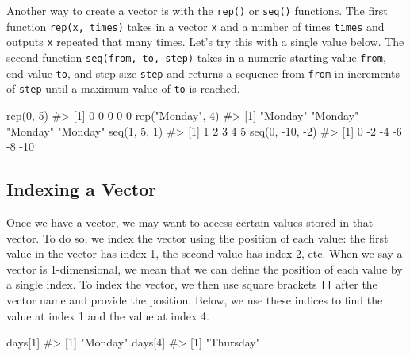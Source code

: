 \documentclass[
  letterpaper,
]{krantz}
\makeatletter
\newenvironment{Shaded}{\begin{snugshade}}{\end{snugshade}}
\newcommand{\CommentTok}[1]{\textcolor[rgb]{0.37,0.37,0.37}{#1}}
\newcommand{\DecValTok}[1]{\textcolor[rgb]{0.68,0.00,0.00}{#1}}
\newcommand{\FunctionTok}[1]{\textcolor[rgb]{0.28,0.35,0.67}{#1}}
\newcommand{\NormalTok}[1]{\textcolor[rgb]{0.00,0.23,0.31}{#1}}
\newcommand{\SpecialCharTok}[1]{\textcolor[rgb]{0.37,0.37,0.37}{#1}}
\newcommand{\StringTok}[1]{\textcolor[rgb]{0.13,0.47,0.30}{#1}}
\newenvironment{kframe}{%
\medskip{}
\setlength{\fboxsep}{.8em}
 \def\at@end@of@kframe{}%
 \ifinner\ifhmode%
  \def\at@end@of@kframe{\end{minipage}}%
  \begin{minipage}{\columnwidth}%
 \fi\fi%
 \def\FrameCommand##1{\hskip\@totalleftmargin \hskip-\fboxsep
 \colorbox{shadecolor}{##1}\hskip-\fboxsep
     \hskip-\linewidth \hskip-\@totalleftmargin \hskip\columnwidth}%
 \MakeFramed {\advance\hsize-\width
   \@totalleftmargin\z@ \linewidth\hsize
   \@setminipage}}%
 {\par\unskip\endMakeFramed%
 \at@end@of@kframe}
\renewenvironment{Shaded}{\begin{kframe}}{\end{kframe}}
\makeatother
\begin{document}
Another way to create a vector is with the \texttt{rep()} or
\texttt{seq()} functions. The first function \texttt{rep(x,\ times)}
takes in a vector \texttt{x} and a number of times \texttt{times} and
outputs \texttt{x} repeated that many times. Let's try this with a
single value below. The second function \texttt{seq(from,\ to,\ step)}
takes in a numeric starting value \texttt{from}, end value \texttt{to},
and step size \texttt{step} and returns a sequence from \texttt{from} in
increments of \texttt{step} until a maximum value of \texttt{to} is
reached.

\begin{Shaded}
\begin{Highlighting}[]
\FunctionTok{rep}\NormalTok{(}\DecValTok{0}\NormalTok{, }\DecValTok{5}\NormalTok{)}
\CommentTok{\#\textgreater{} [1] 0 0 0 0 0}
\FunctionTok{rep}\NormalTok{(}\StringTok{"Monday"}\NormalTok{, }\DecValTok{4}\NormalTok{)}
\CommentTok{\#\textgreater{} [1] "Monday" "Monday" "Monday" "Monday"}
\FunctionTok{seq}\NormalTok{(}\DecValTok{1}\NormalTok{, }\DecValTok{5}\NormalTok{, }\DecValTok{1}\NormalTok{)}
\CommentTok{\#\textgreater{} [1] 1 2 3 4 5}
\FunctionTok{seq}\NormalTok{(}\DecValTok{0}\NormalTok{, }\SpecialCharTok{{-}}\DecValTok{10}\NormalTok{, }\SpecialCharTok{{-}}\DecValTok{2}\NormalTok{)}
\CommentTok{\#\textgreater{} [1]   0  {-}2  {-}4  {-}6  {-}8 {-}10}
\end{Highlighting}
\end{Shaded}

\hypertarget{indexing-a-vector}{%
\subsection{Indexing a Vector}\label{indexing-a-vector}}

Once we have a vector, we may want to access certain values stored in
that vector. To do so, we index the vector using the position of each
value: the first value in the vector has index 1, the second value has
index 2, etc. When we say a vector is 1-dimensional, we mean that we can
define the position of each value by a single index. To index the
vector, we then use square brackets \texttt{{[}{]}} after the vector
name and provide the position. Below, we use these indices to find the
value at index 1 and the value at index 4.

\begin{Shaded}
\begin{Highlighting}[]
\NormalTok{days[}\DecValTok{1}\NormalTok{]}
\CommentTok{\#\textgreater{} [1] "Monday"}
\NormalTok{days[}\DecValTok{4}\NormalTok{]}
\CommentTok{\#\textgreater{} [1] "Thursday"}
\end{Highlighting}
\end{Shaded}
\end{document}

